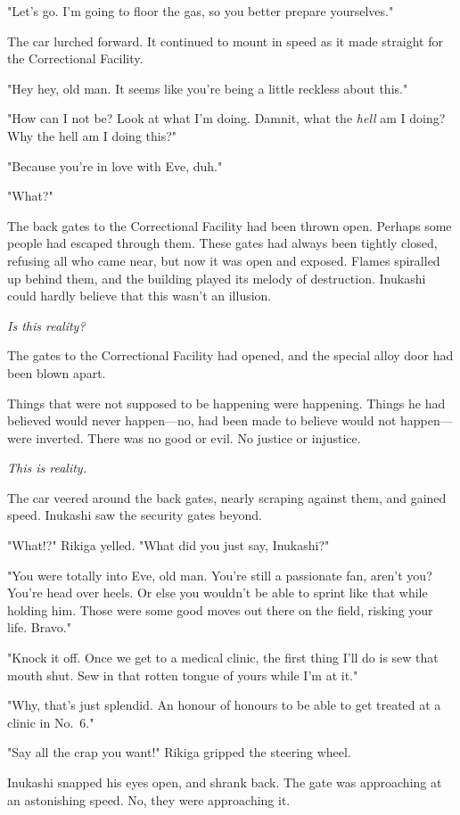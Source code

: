 "Let's go. I'm going to floor the gas, so you better prepare
yourselves."

The car lurched forward. It continued to mount in speed as it made
straight for the Correctional Facility.

"Hey hey, old man. It seems like you're being a little reckless about
this."

"How can I not be? Look at what I'm doing. Damnit, what the \emph{hell} am I
doing? Why the hell am I doing this?"

"Because you're in love with Eve, duh."

"What?"

The back gates to the Correctional Facility had been thrown open.
Perhaps some people had escaped through them. These gates had always
been tightly closed, refusing all who came near, but now it was open and
exposed. Flames spiralled up behind them, and the building played its
melody of destruction. Inukashi could hardly believe that this wasn't an
illusion.

\emph{Is this reality?}

The gates to the Correctional Facility had opened, and the special alloy
door had been blown apart.

Things that were not supposed to be happening were happening. Things he
had believed would never happen---no, had been made to believe would not
happen---were inverted. There was no good or evil. No justice or
injustice.

\emph{This is reality.}

The car veered around the back gates, nearly scraping against them, and
gained speed. Inukashi saw the security gates beyond.

"What!?" Rikiga yelled. "What did you just say, Inukashi?"

"You were totally into Eve, old man. You're still a passionate fan,
aren't you? You're head over heels. Or else you wouldn't be able to
sprint like that while holding him. Those were some good moves out there
on the field, risking your life. Bravo."

"Knock it off. Once we get to a medical clinic, the first thing I'll do
is sew that mouth shut. Sew in that rotten tongue of yours while I'm at
it."

"Why, that's just splendid. An honour of honours to be able to get
treated at a clinic in No.~6."

"Say all the crap you want!" Rikiga gripped the steering wheel.

Inukashi snapped his eyes open, and shrank back. The gate was
approaching at an astonishing speed. No, they were approaching it.

